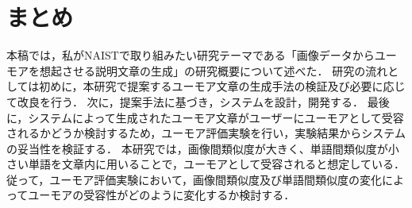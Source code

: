 \documentclass[twocolumn,2pt]{jarticle}
\begin{document}
\section{まとめ}
本稿では，私がNAISTで取り組みたい研究テーマである「画像データからユーモアを想起させる説明文章の生成」の研究概要について述べた．
研究の流れとしては初めに，本研究で提案するユーモア文章の生成手法の検証及び必要に応じて改良を行う．
次に，提案手法に基づき，システムを設計，開発する．
最後に，システムによって生成されたユーモア文章がユーザーにユーモアとして受容されるかどうか検討するため，ユーモア評価実験を行い，実験結果からシステムの妥当性を検証する．
本研究では，画像間類似度が大きく、単語間類似度が小さい単語を文章内に用いることで，ユーモアとして受容されると想定している．
従って，ユーモア評価実験において，画像間類似度及び単語間類似度の変化によってユーモアの受容性がどのように変化するか検討する．




\end{document}
